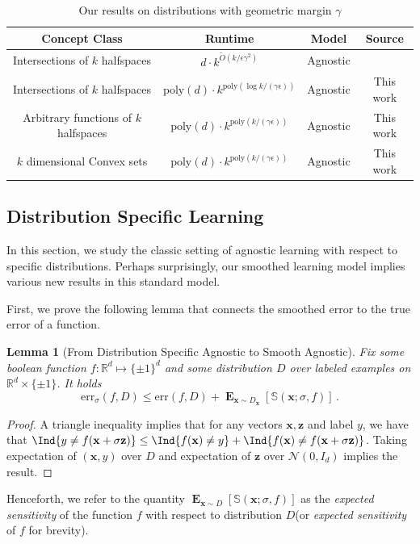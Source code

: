 \documentclass[10pt,a4paper]{article}
\newtheorem{lemma}{Lemma}[section]
\renewcommand\vec[1]{\mathbf{#1}}
\DeclareMathOperator*{\E}{\mathbf{E}}
\newcommand{\err}{\mathrm{err}}
\newcommand{\R}{\mathbb{R}}
\newcommand{\poly}{\mathrm{poly}}
\newcommand{\1}{\Ind}
\newcommand{\x}{\vec x}
\newcommand{\z}{\vec z}
\newcommand{\Gauss}{\mathcal{N}}
\begin{document}
\begin{table}[ht]
\centering
\begin{tabular}{|c|c|c|c|}
\hline
Concept Class & Runtime & Model & Source \\
\hline
\hline

Intersections  of $k$ halfspaces  & $d\cdot k^{\tilde{O}(k/\epsilon\gamma^2)}$ & Agnostic & \cite{ArriagaVempala:99}\\
\hline
Intersections of $k$ halfspaces & $\poly(d)\cdot k^{\poly(\log k/(\gamma\epsilon))}$ & Agnostic & This work \\
\hline

Arbitrary functions of $k$ halfspaces & $\poly(d)\cdot k^{\poly(k/(\gamma\epsilon))}$ & Agnostic & This work \\
\hline
$k$ dimensional Convex sets  & $\poly(d)\cdot k^{\poly(k/(\gamma\epsilon))}$ & Agnostic & This work \\
\hline
\end{tabular}
\caption{Our results on distributions with geometric margin $\gamma$}
\label{tab:margin}
\end{table}




\subsection{Distribution Specific Learning} 
In this section, we study the classic setting of agnostic learning with respect to specific distributions. Perhaps surprisingly, our smoothed learning model implies various new results in this standard model. 

First, we prove the following lemma that connects the smoothed error to the true error of a function.
\begin{lemma}[From Distribution Specific Agnostic to Smooth Agnostic]
\label{obs:agnostic_to_smooth}
Fix some boolean function $f:\R^d\mapsto \{\pm 1\}^d$ and some distribution $D$ over labeled
examples on $\R^d \times \{ \pm 1\}$.
It holds
\[
        \err_\sigma(f,D)
        \leq 
         \err(f,D) 
         + \E_{\x\sim D_{\x}}
         [\mathbb S(\x;\sigma, f)]
         \,.
\]
\end{lemma}
\begin{proof}
    A triangle inequality implies that for any vectors $\x,\z$ and label $y$, we have that $\1\{y\neq f(\x+\sigma\z)\}\leq \1\{f(\x)\neq y\}+\1\{f(\x)\neq f(\x+\sigma\z)\} $. Taking expectation of $(\x,y)$ over $D$ and expectation of $\z$ over $\Gauss(0,I_d)$ implies the result.
\end{proof}
Henceforth, we refer to the quantity $\E_{\x\sim D}[\mathbb{S}(\x;\sigma,f)]$ as the \textit{expected sensitivity} of the function $f$ with respect to distribution $D$(or \textit{expected sensitivity} of $f$ for brevity).
\end{document}
